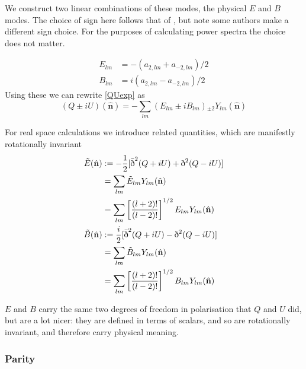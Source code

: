 \documentclass[a4paper,10pt]{article}
\renewcommand{\v}[1]{\mathbf{#1}}
\newcommand{\half}{\frac{1}{2}}
\newcommand{\unit}[1]{\hat{\v{#1}}}
\newcommand{\sr}{\text{\normalfont\dh}}
\renewcommand{\sl}{\bar{\text{\normalfont\dh}}}
\newcommand{\ltwo}{\left[\frac{(l+2)!}{(l-2)!}\right]}
\begin{document}
We construct two linear combinations of these modes, the physical $E$ and $B$ modes. The choice of sign here follows that of \cite{all-sky}, but note some authors make a different sign choice. For the purposes of calculating power spectra the choice does not matter.

\begin{equation}\begin{split} 
E_{lm} &= -(a_{2,lm} + a_{-2,lm})/2\\
B_{lm} &= i(a_{2,lm} - a_{-2,lm})/2
\end{split}\end{equation}
Using these we can rewrite \ref{QUexp} as 
\begin{equation}
(Q\pm iU)(\unit{n}) = -\sum_{lm} (E_{lm} \pm i B_{lm}) {}_{\pm2}Y_{lm}(\unit{n})
\label{QUEB}
\end{equation}

For real space calculations we introduce related quantities, which are manifestly rotationally invariant
\begin{equation}\begin{split}
\tilde{E}(\unit{n}) &:= -\half[\sl^2(Q+iU) + \sr^2(Q-iU)]\\
&= \sum_{lm} \tilde{E}_{lm}Y_{lm}(\unit{n})\\
&= \sum_{lm} \ltwo^{1/2}E_{lm}Y_{lm}(\unit{n})\\
\tilde{B}(\unit{n}) &:= \frac{i}{2}[\sl^2(Q+iU) - \sr^2(Q-iU)]\\
&= \sum_{lm} \tilde{B}_{lm}Y_{lm}(\unit{n})\\
&= \sum_{lm} \ltwo^{1/2}B_{lm}Y_{lm}(\unit{n})
\label{EBmodes}
\end{split}\end{equation}

$E$ and $B$ carry the same two degrees of freedom in polarisation that $Q$ and $U$ did, but are a lot nicer: they are defined in terms of scalars, and so are rotationally invariant, and therefore carry physical meaning.

\subsubsection{Parity}
\end{document}
